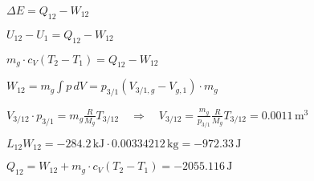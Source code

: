 \( \Delta E = Q_{12} - W_{12} \)  

\( U_{12} - U_1 = Q_{12} - W_{12} \)  

\( m_g \cdot c_V (T_2 - T_1) = Q_{12} - W_{12} \)  

\( W_{12} = m_g \int p \, dV = p_{3/1} (V_{3/1,g} - V_{g,1}) \cdot m_g \)  

\( V_{3/12} \cdot p_{3/1} = m_g \frac{R}{M_g} T_{3/12} \quad \Rightarrow \quad V_{3/12} = \frac{m_g}{p_{3/1}} \frac{R}{M_g} T_{3/12} = 0.0011 \, \text{m}^3 \)  

\( L_{12} W_{12} = -284.2 \, \text{kJ} \cdot 0.00334212 \, \text{kg} = -972.33 \, \text{J} \)  

\( Q_{12} = W_{12} + m_g \cdot c_V (T_2 - T_1) = -2055.116 \, \text{J} \)